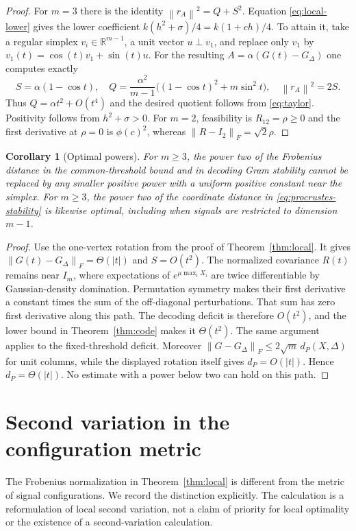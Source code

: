 \documentclass[11pt]{article}
\newtheorem{corollary}[theorem]{Corollary}
\theoremstyle{remark}\newtheorem{remark}[theorem]{Remark}
\newcommand{\R}{\mathbb R}
\newcommand{\norm}[1]{\left\lVert#1\right\rVert}
\begin{document}
\begin{proof}
For $m=3$ there is the identity $\norm{r_A}^2=Q+S^2$.
Equation \eqref{eq:local-lower} gives the lower coefficient
$k(h^2+\sigma)/4=k(1+ch)/4$.
To attain it, take a regular simplex $v_i\in\R^{m-1}$, a unit vector
$u\perp v_1$, and replace only $v_1$ by $v_1(t)=\cos(t)v_1+\sin(t)u$.
For the resulting $A=\alpha(G(t)-G_\Delta)$ one computes exactly
\[
 S=\alpha(1-\cos t),\quad
 Q=\frac{\alpha^2}{m-1}\big((1-\cos t)^2+m\sin^2t\big),\quad
 \norm{r_A}^2=2S.
\]
Thus $Q=\alpha t^2+O(t^4)$ and the desired quotient follows from
\eqref{eq:taylor}. Positivity follows from $h^2+\sigma>0$.
For $m=2$, feasibility is $R_{12}=\rho\ge0$ and the first derivative at
$\rho=0$ is $\phi(c)^2$, whereas $\norm{R-I_2}_F=\sqrt2\rho$.
\end{proof}

\begin{corollary}[Optimal powers]\label{cor:optimal}
For $m\ge3$, the power two of the Frobenius distance in the common-threshold
bound and in decoding Gram stability cannot be replaced by any smaller
positive power with a uniform positive constant near the simplex.
For $m\ge3$, the power two of the coordinate distance in \eqref{eq:procrustes-stability}
is likewise optimal, including when signals are restricted to dimension $m-1$.
\end{corollary}
\begin{proof}
Use the one-vertex rotation from the proof of Theorem~\ref{thm:local}.
It gives $\norm{G(t)-G_\Delta}_F=\Theta(|t|)$ and $S=O(t^2)$.
The normalized covariance $R(t)$ remains near $I_m$, where expectations of
$e^{\mu\max_i X_i}$ are twice differentiable by Gaussian-density domination.
Permutation symmetry makes their first derivative a constant times the sum
of the off-diagonal perturbations. That sum has zero first derivative along
this path. The decoding deficit is therefore $O(t^2)$, and the lower bound
in Theorem~\ref{thm:code} makes it $\Theta(t^2)$.
The same argument applies to the fixed-threshold deficit.
Moreover $\norm{G-G_\Delta}_F\le2\sqrt m\,d_P(X,\Delta)$ for unit columns,
while the displayed rotation itself gives $d_P=O(|t|)$. Hence $d_P=\Theta(|t|)$.
No estimate with a power below two can hold on this path.
\end{proof}

\section{Second variation in the configuration metric}\label{sec:spectrum}

The Frobenius normalization in Theorem~\ref{thm:local} is different from the
metric of signal configurations.  We record the distinction explicitly.
The calculation is a reformulation of local second variation, not a
claim of priority for local optimality or the existence of a
second-variation calculation.
\end{document}
